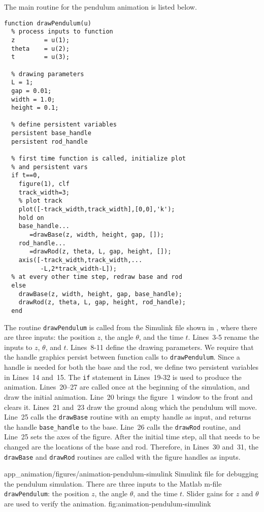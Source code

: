 The main routine for the pendulum animation is listed below.
\begin{lstlisting}
function drawPendulum(u)
  % process inputs to function
  z        = u(1);
  theta    = u(2);
  t        = u(3);

  % drawing parameters
  L = 1;
  gap = 0.01;
  width = 1.0;
  height = 0.1;

  % define persistent variables
  persistent base_handle
  persistent rod_handle

  % first time function is called, initialize plot 
  % and persistent vars
  if t==0,
    figure(1), clf
    track_width=3;
    % plot track
    plot([-track_width,track_width],[0,0],'k'); 
    hold on
    base_handle...
       =drawBase(z, width, height, gap, []);
    rod_handle...
       =drawRod(z, theta, L, gap, height, []);
    axis([-track_width,track_width,...
          -L,2*track_width-L]);
  % at every other time step, redraw base and rod
  else
    drawBase(z, width, height, gap, base_handle);
    drawRod(z, theta, L, gap, height, rod_handle);
  end
\end{lstlisting}
The routine {\tt drawPendulum} is called from the Simulink file shown in , where there are three inputs: the position $z$, the angle $\theta$, and the time $t$.  Lines~3-5 rename the inputs to $z$, $\theta$, and $t$.  Lines~8-11 define the drawing parameters.  We require that the handle graphics persist between function calls to {\tt drawPendulum}.  Since a handle is needed for both the base and the rod, we define two persistent variables in Lines~14 and~15.  The {\tt if} statement in Lines~19-32 is used to produce the animation.  Lines~20--27 are called once at the beginning of the simulation, and draw the initial animation.  Line~20 brings the figure~1 window to the front and clears it.  Lines~21 and~23 draw the ground along which the pendulum will move.  Line~25 calls the {\tt drawBase} routine with an empty handle as input, and returns the handle \texttt{base\_handle} to the base.   Line~26 calls the {\tt drawRod} routine, and Line~25 sets the axes of the figure.  After the initial time step, all that needs to be changed are the locations of the base and rod.  Therefore, in Lines~30 and~31, the {\tt drawBase} and {\tt drawRod} routines are called with the figure handles as inputs.

	{app_animation/figures/animation-pendulum-simulink}
	{Simulink file for debugging the pendulum simulation.  There are three inputs to the Matlab m-file {\tt drawPendulum}: the position $z$, the angle $\theta$, and the time $t$.  Slider gains for $z$ and $\theta$ are used to verify the animation.}
	{fig:animation-pendulum-simulink}
